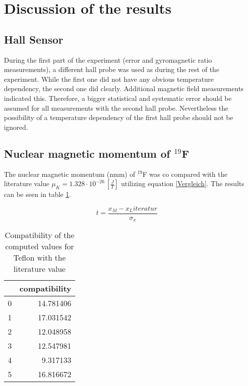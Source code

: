 \section{Discussion of the results}
\subsection{Hall Sensor}
During the first part of the experiment (error and gyromagnetic ratio measurements), a different hall probe was used as during the rest of the experiment. While the first one did not have any obvious temperature dependency, the second one did clearly. Additional magnetic field measurements indicated this. Therefore, a bigger statistical and systematic error should be assumed for all measurements with the second hall probe. Nevertheless the possibility of a temperature dependency of the first hall probe should not be ignored. 
\FloatBarrier
\subsection{Nuclear magnetic momentum of $^{19}$F}
The nuclear magnetic momentum (nmm) of $^{19}$F was co compared with the literature value $\mu_K =1.328\cdot 10^{-26}\,\left[\frac{J}{T}\right]$ \cite{demtr} utilizing equation \ref{Vergleich}. The results can be seen in table \ref{vlg_f}.


\begin{equation}
t=\frac{x_M-x_Literatur}{\sigma_x}
\label{Vergleich}
\end{equation}

\begin{table}
	\caption{Compatibility of the computed values for Teflon with the literature value}
	\label{vlg_f}
	\centering
	\begin{tabular}{lr}
		\toprule
		{} &  compatibility \\
		\midrule
		0 &      14.781406 \\
		1 &      17.031542 \\
		2 &      12.048958 \\
		3 &      12.547981 \\
		4 &       9.317133 \\
		5 &      16.816672 \\
		\bottomrule
	\end{tabular}
\end{table}

